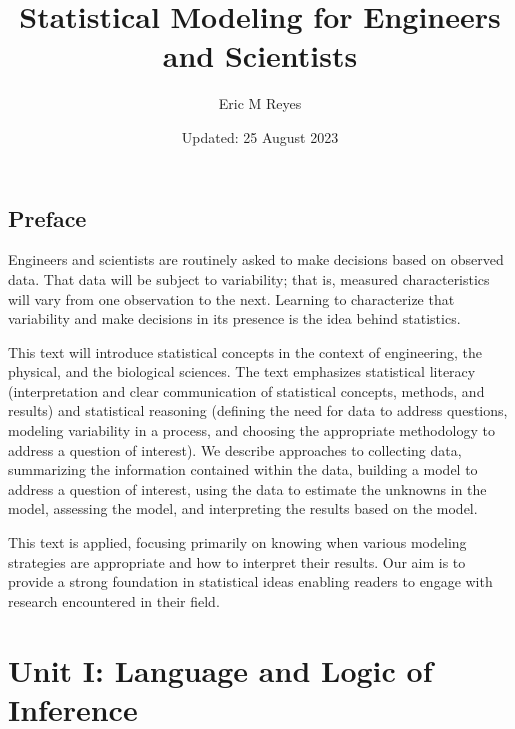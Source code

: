 \documentclass[
  letterpaper,
  DIV=11,
  numbers=noendperiod]{scrreprt}
\title{Statistical Modeling for Engineers and Scientists}
\author{Eric M Reyes}
\date{Updated: 25 August 2023}
\renewcommand*\contentsname{Table of contents}
\newcommand\contentsname{Table of contents}
\theoremstyle{plain}
\theoremstyle{definition}
\theoremstyle{definition}
\theoremstyle{remark}
\begin{document}
\maketitle
\ifdefined\Shaded\renewenvironment{Shaded}{\begin{tcolorbox}[breakable, borderline west={3pt}{0pt}{shadecolor}, boxrule=0pt, interior hidden, enhanced, sharp corners, frame hidden]}{\end{tcolorbox}}\fi

\renewcommand*\contentsname{Table of contents}
{
\hypersetup{linkcolor=}
\setcounter{tocdepth}{2}
\tableofcontents
}

\hypertarget{preface}{%
\chapter*{Preface}\label{preface}}


Engineers and scientists are routinely asked to make decisions based on
observed data. That data will be subject to variability; that is,
measured characteristics will vary from one observation to the next.
Learning to characterize that variability and make decisions in its
presence is the idea behind statistics.

This text will introduce statistical concepts in the context of
engineering, the physical, and the biological sciences. The text
emphasizes statistical literacy (interpretation and clear communication
of statistical concepts, methods, and results) and statistical reasoning
(defining the need for data to address questions, modeling variability
in a process, and choosing the appropriate methodology to address a
question of interest). We describe approaches to collecting data,
summarizing the information contained within the data, building a model
to address a question of interest, using the data to estimate the
unknowns in the model, assessing the model, and interpreting the results
based on the model.

This text is applied, focusing primarily on knowing when various
modeling strategies are appropriate and how to interpret their results.
Our aim is to provide a strong foundation in statistical ideas enabling
readers to engage with research encountered in their field.

\part{Unit I: Language and Logic of Inference}
\end{document}

